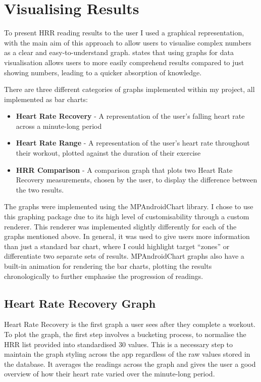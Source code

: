 \documentclass{l4proj}
\begin{document}
\section{Visualising Results}
\label{sec:visualiseresults}

To present HRR reading results to the user I used a graphical representation, with the main aim of this approach to allow users to visualise complex numbers as a clear and easy-to-understand graph. \cite{Tableau_2024} states that using graphs for data visualisation allows users to more easily comprehend results compared to just showing numbers, leading to a quicker absorption of knowledge.

There are three different categories of graphs implemented within my project, all implemented as bar charts:

\begin{itemize}
    \item \textbf{Heart Rate Recovery} - A representation of the user’s falling heart rate across a minute-long period
    \item \textbf{Heart Rate Range} - A representation of the user’s heart rate throughout their workout, plotted against the duration of their exercise
    \item \textbf{HRR Comparison} - A comparison graph that plots two Heart Rate Recovery measurements, chosen by the user, to display the difference between the two results.
\end{itemize}

The graphs were implemented using the MPAndroidChart library. I chose to use this graphing package due to its high level of customisability through a custom renderer. This renderer was implemented slightly differently for each of the graphs mentioned above. In general, it was used to give users more information than just a standard bar chart, where I could highlight target “zones” or differentiate two separate sets of results. MPAndroidChart graphs also have a built-in animation for rendering the bar charts, plotting the results chronologically to further emphasise the progression of readings. 

\subsection{Heart Rate Recovery Graph}
\label{sec:hrrgraph}

Heart Rate Recovery is the first graph a user sees after they complete a workout. To plot the graph, the first step involves a bucketing process, to normalise the HRR list provided into standardised 30 values. This is a necessary step to maintain the graph styling across the app regardless of the raw values stored in the database. It averages the readings across the graph and gives the user a good overview of how their heart rate varied over the minute-long period. 
\end{document}
